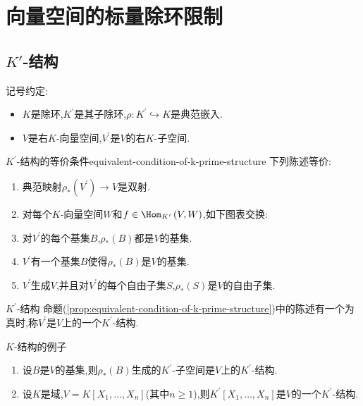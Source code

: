 \chapter{向量空间的标量除环限制}

\section{\texorpdfstring{$K'$}{K'}-结构}

记号约定:

\begin{itemize}
	\item $K$是除环,$K^{\prime}$是其子除环,$\rho:K^{\prime}\hookrightarrow K$是典范嵌入.
	\item $V$是右$K$-向量空间,$V^{\prime}$是$V$的右$K$-子空间.
\end{itemize}

\begin{proposition}{$K^{\prime}$-结构的等价条件}{equivalent-condition-of-k-prime-structure}
	下列陈述等价:
	\begin{enumerate}
		\item 典范映射$\rho_{\ast}\left(V^{\prime}\right)\to V$是双射.
		\item 对每个$K$-向量空间$W$和$f\in\Hom_{K^{\prime}}\left(V,W\right)$,如下图表交换:
		\begin{center}
		\end{center}
		\item 对$V^{\prime}$的每个基集$B$,$\rho_{\ast}\left(B\right)$都是$V$的基集.
		\item $V^{\prime}$有一个基集$B$使得$\rho_{\ast}\left(B\right)$是$V$的基集.
		\item $V^{\prime}$生成$V$,并且对$V^{\prime}$的每个自由子集$S$,$\rho_{\ast}\left(S\right)$是$V$的自由子集.
	\end{enumerate}
\end{proposition}

\begin{definition}{$K^{\prime}$-结构}{}
	命题(\cref{prop:equivalent-condition-of-k-prime-structure})中的陈述有一个为真时,称$V^{\prime}$是$V$上的一个$K^{\prime}$-结构.
\end{definition}

\begin{example}{$K$-结构的例子}{}
	\begin{enumerate}
		\item 设$B$是$V$的基集,则$\rho_{\ast}\left(B\right)$生成的$K^{\prime}$-子空间是$V$上的$K^{\prime}$-结构.
		\item 设$K$是域,$V=K\left[X_{1},\ldots,X_{n}\right]$(其中$n\geq 1$),则$K^{\prime}\left[X_{1},\ldots,X_{n}\right]$是$V$的一个$K^{\prime}$-结构.
	\end{enumerate}
\end{example}






